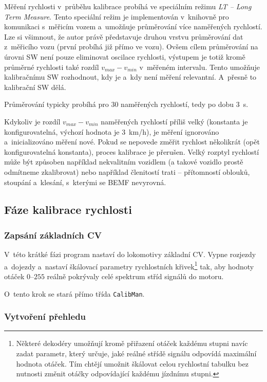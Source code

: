 Měření rychlosti v~průběhu kalibrace probíhá ve speciálním režimu
\textit{\gls{LT} -- Long Term Measure}. Tento speciální režim je implementován
v~knihov\-ně pro komunikaci s~měřicím vozem a~umožňuje průměrování více
naměřených rychlostí. Lze si všimnout, že autor právě představuje
druhou vrstvu průměrování dat z~měřicího vozu (první probíhá již přímo ve
vozu). Ovšem cílem průměrování na úrovni SW není pouze eliminovat oscilace
rychlosti, výstupem je totiž kromě průměrné rychlosti také rozdíl $v_{max} -
v_{min}$ v~měřeném intervalu. Tento  umožňuje kalibračnímu SW
rozhodnout, kdy je a~kdy není měření relevantní.  A~přesně to kalibrační SW
dělá.

Průměrování typicky probíhá pro $30$ naměřených rychlostí, tedy po dobu $3$~s.

Kdykoliv je rozdíl $v_{max} - v_{min}$ naměřených rychlostí příliš velký
(konstanta je konfigurovatelná, výchozí hodnota je $3$~km/h), je měření
ignorováno a~inicializováno měření nové. Pokud se nepovede změřit rychlost
několikrát (opět konfigurovatelná konstanta), proces kalibrace je přerušen.
Velký rozptyl rychlostí může být způsoben například nekvalitním vozidlem (a
takové vozidlo prostě odmítneme zkalibrovat) nebo například členitostí trati --
přítomností oblouků, stoupání a~klesání, s~kterými se \gls{BEMF} nevyrovná.

\subsection{Fáze kalibrace rychlosti}

\subsubsection{Zapsání základních \gls{CV}}

V~této krátké fázi program nastaví do lokomotivy základní \gls{CV}. Vypne
rozjezdy a~dojezdy a~nastaví škálovací parametry rychlostních
křivek\footnote{Některé dekodéry umožňují kromě přiřazení otáček každému stupni
navíc zadat parametr, který určuje, jaké reálné střídě signálu odpovídá
maximální hodnota otáček.  Tím chtějí umožnit škálovat celou rychlostní tabulku
bez nutnosti změnit otáčky odpovídající každému jízdnímu stupni.} tak, aby
hodnoty otáček $0$--$255$ reálně pokrývaly celé spektrum stříd signálů do
motoru.

O~tento krok se stará přímo třída \texttt{CalibMan}.

\subsubsection{Vytvoření přehledu}

